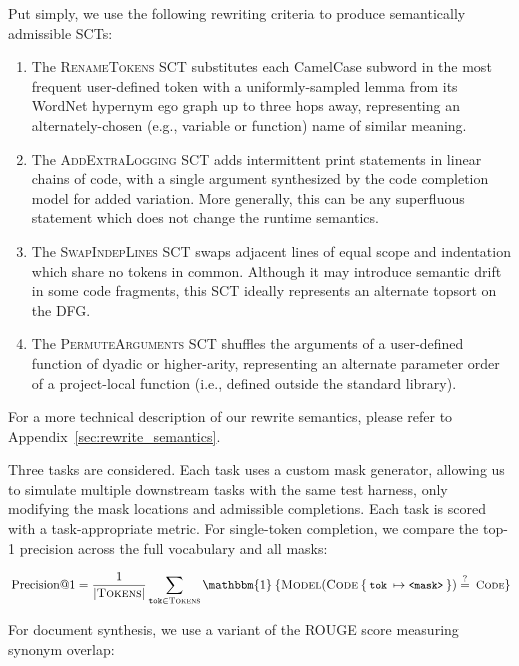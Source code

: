\documentclass[usenames,dvipsnames]{article} %
\begin{document}
  Put simply, we use the following rewriting criteria to produce semantically admissible SCTs:

  \begin{enumerate}[itemsep=1ex]
    \item The \textsc{RenameTokens} SCT substitutes each CamelCase subword in the most frequent user-defined token with a uniformly-sampled lemma from its WordNet hypernym ego graph up to three hops away, representing an alternately-chosen (e.g., variable or function) name of similar meaning.
    \item The \textsc{AddExtraLogging} SCT adds intermittent print statements in linear chains of code, with a single argument synthesized by the code completion model for added variation. More generally, this can be any superfluous statement which does not change the runtime semantics.
    \item The \textsc{SwapIndepLines} SCT swaps adjacent lines of equal scope and indentation which share no tokens in common. Although it may introduce semantic drift in some code fragments, this SCT ideally represents an alternate topsort on the DFG.
    \item The \textsc{PermuteArguments} SCT shuffles the arguments of a user-defined function of dyadic or higher-arity, representing an alternate parameter order of a project-local function (i.e., defined outside the standard library).
  \end{enumerate}

  For a more technical description of our rewrite semantics, please refer to Appendix~\ref{sec:rewrite_semantics}.

  Three tasks are considered. Each task uses a custom mask generator, allowing us to simulate multiple downstream tasks with the same test harness, only modifying the mask locations and admissible completions. Each task is scored with a task-appropriate metric. For single-token completion, we compare the top-1 precision across the full vocabulary and all masks:

  \begin{equation*}
    \:\text{Precision@1} = \frac{1}{{|\textsc{Tokens}|}}\sum_{\texttt{tok}\in \textsc{Tokens}}\mathbbm{1}\:\{\textsc{Model}(\textsc{Code}\:\{\:\small{\texttt{tok}}\:\mapsto\small{\texttt{<mask>}}\:\}) \overset{?}{=} \:\textsc{Code}\}
  \end{equation*}

  For document synthesis, we use a variant of the ROUGE score measuring synonym overlap:
\end{document}
